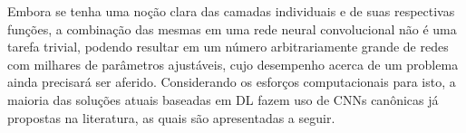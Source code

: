 
Embora se tenha uma noção clara das camadas individuais e de suas respectivas funções, a combinação das mesmas em uma rede neural convolucional não é uma tarefa trivial, podendo resultar em um número arbitrariamente grande de redes com milhares de parâmetros ajustáveis, cujo desempenho acerca de um problema ainda precisará ser aferido. Considerando os esforços computacionais para isto, a maioria das soluções atuais baseadas em DL fazem uso de CNNs canônicas já propostas na literatura, as quais são apresentadas a seguir.
